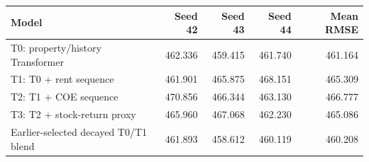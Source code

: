 \begin{tabular}{lrrrr}
\toprule
Model & Seed 42 & Seed 43 & Seed 44 & Mean RMSE \\
\midrule
T0: property/history Transformer & 462.336 & 459.415 & 461.740 & 461.164 \\
T1: T0 + rent sequence & 461.901 & 465.875 & 468.151 & 465.309 \\
T2: T1 + COE sequence & 470.856 & 466.344 & 463.130 & 466.777 \\
T3: T2 + stock-return proxy & 465.960 & 467.068 & 462.230 & 465.086 \\
Earlier-selected decayed T0/T1 blend & 461.893 & 458.612 & 460.119 & 460.208 \\
\bottomrule
\end{tabular}
